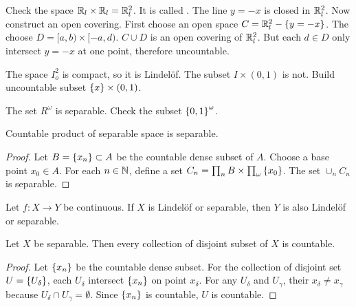\begin{theorem}
    Check the space $\mathbb{R}_l \times \mathbb{R}_l = \mathbb{R}_l^2$. It is called . The line $y = -x$ is closed in $\mathbb{R}_l^2$. Now construct an open covering. First choose an open space $C = \mathbb{R}_l^2 - \set{y=-x}$. The choose $D = [a,b) \times [-a, d)$. $C \cup D$ is an open covering of $\mathbb{R}_l^2$. But each $d\in D$ only intersect $y = -x$ at one point, therefore uncountable.
\end{theorem}

\begin{theorem}
    The space $I_o^2$ is compact, so it is Lindel\"of. The subset $I \times (0,1)$ is not. Build uncountable subset $\set{x} \times (0,1)$.
\end{theorem}

\begin{theorem}
    The set $R^\omega$ is separable. Check the subset $\set{0,1}^\omega$. 
\end{theorem}

\begin{theorem}
    Countable product of separable space is separable.
\end{theorem}
\begin{proof}
    Let $B = \set{x_n} \subset A$ be the countable dense subset of $A$. Choose a base point $x_0 \in A$. For each ${n \in \mathbb{N}}$, define a set $C_n = \prod_n B \times \prod_\omega \set{x_0}$. The set $\cup_n C_n$ is separable.
\end{proof}


\begin{theorem}
    Let $f:X \rightarrow Y$ be continuous. If $X$ is Lindel\"of or separable, then $Y$ is also Lindel\"of or separable.
\end{theorem}


\begin{theorem}
    Let $X$ be separable. Then every collection of disjoint subset of $X$ is countable.
\end{theorem}
\begin{proof}
    Let $\set{x_n}$ be the countable dense subset. For the collection of disjoint set $U = \set{U_\delta}$, each $U_\delta$  intersect $\set{x_n}$ on point $x_\delta$. For any $U_\delta$ and $U_\gamma$, their $x_\delta \neq x_\gamma$ because $U_\delta \cap U_\gamma = \emptyset$. Since $\set{x_n}$ is countable, $U$ is countable.
\end{proof}



